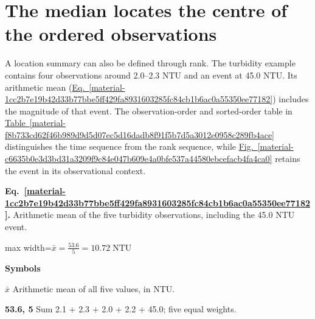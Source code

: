 \documentclass[11pt,a4paper]{article}
\begin{document}
\medskip

\clearpage
\section{The median locates the centre of the ordered observations}
A location summary can also be defined through rank. The turbidity example contains four observations around 2.0–2.3 NTU and an event at 45.0 NTU. Its arithmetic mean (\hyperref[material-1cc2b7e19b42d33b77bbe5ff429fa8931603285fc84cb1b6ac0a55350ee77182]{Eq.~\ref*{material-1cc2b7e19b42d33b77bbe5ff429fa8931603285fc84cb1b6ac0a55350ee77182}}) includes the magnitude of that event. The observation-order and sorted-order table in \hyperref[material-f8b733cd62f46b989d9d5d07ec5d16dadb8f91f5b7d5a3012e0958c289fb4ace]{Table~\ref*{material-f8b733cd62f46b989d9d5d07ec5d16dadb8f91f5b7d5a3012e0958c289fb4ace}} distinguishes the time sequence from the rank sequence, while \hyperref[material-c6635b0e3d3bd31a3209f9c84e047b609e4a0bfe537a44580ebcefacb4fa4ca0]{Fig.~\ref*{material-c6635b0e3d3bd31a3209f9c84e047b609e4a0bfe537a44580ebcefacb4fa4ca0}} retains the event in its observational context.


\par\medskip
\begin{samepage}
\label{material-1cc2b7e19b42d33b77bbe5ff429fa8931603285fc84cb1b6ac0a55350ee77182}
\noindent\textbf{Eq.~\ref*{material-1cc2b7e19b42d33b77bbe5ff429fa8931603285fc84cb1b6ac0a55350ee77182}.} Arithmetic mean of the five turbidity observations, including the 45.0 NTU event.\par\nopagebreak
\begin{center}\begin{adjustbox}{max width=\linewidth}$\displaystyle \bar{x}=\frac{53.6}{5}=10.72\;\mathrm{NTU}$\end{adjustbox}\end{center}

\par\noindent\textbf{Symbols}

\par\noindent\textbf{\ensuremath{\bar{x}}} Arithmetic mean of all five values, in NTU.

\par\noindent\textbf{53.6, 5} Sum 2.1 + 2.3 + 2.0 + 2.2 + 45.0; five equal weights.

\end{samepage}
\medskip
\end{document}
